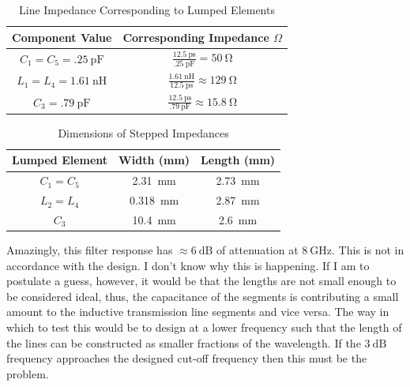     \begin{table}[H]
        \centering
        \caption{Line Impedance Corresponding to Lumped Elements}
        \label{tab:1b_line_impedance_of_lumped_elements}
        \begin{tabular}{|c|c|}
            \hline Component Value & Corresponding Impedance $ \Omega $ \\
            \hline $C_1 = C_5 = \SI{.25}{\pico\farad} $ &
            $\frac{\SI{12.5}{\pico\second}}{\SI{.25}{\pico\farad}} =
            \SI{50}{\ohm}$ \\
            \hline $L_1 = L_4 = \SI{1.61}{\nano\henry}$ &
            $\frac{\SI{1.61}{\nano\henry}}{\SI{12.5}{\pico\second}} \approx
            \SI{129}{\ohm}$  \\
            \hline $ C_3 =  \SI{.79}{\pico\farad} $ &
            $\frac{\SI{12.5}{\pico\second}}{\SI{.79}{\pico\farad}} \approx
            \SI{15.8}{\ohm} $ \\
            \hline
        \end{tabular}
    \end{table}

    \begin{table}[H]
        \centering
        \caption{Dimensions of Stepped Impedances}
        \label{tab:1b_stepped_impedance_dimensions}
        \begin{tabular}{|c|c|c|}
            \hline Lumped Element & Width (mm)  & Length (mm) \\
            \hline $ C_1 = C_5 $ & \SI{2.31}{mm} & \SI{2.73}{mm} \\
            \hline $ L_2 = L_4 $ & \SI{.318}{mm} & \SI{2.87}{mm}  \\
            \hline $ C_3 $ & \SI{10.4}{mm} & \SI{2.6}{mm}  \\
            \hline
        \end{tabular}
    \end{table}

    Amazingly, this filter response has $\approx \SI{6}{\deci\bel} $ of
    attenuation at $ \SI{8}{\giga\hertz} $. This is not in accordance with the
    design. I don't know why this is happening. If I am to postulate a guess,
    however, it would be that the lengths are not small enough to be considered
    ideal, thus, the capacitance of the segments is contributing a small amount
    to the inductive transmission line segments and vice versa. The way in which
    to test this would be to design at a  lower frequency such that the
    length of the lines can be constructed as smaller fractions of the
    wavelength. If the $\SI{3}{\deci\bel}$ frequency approaches the designed
    cut-off frequency then this must be the problem.
    
